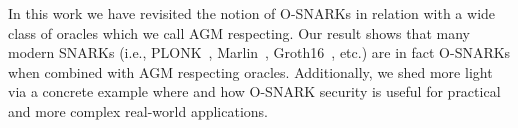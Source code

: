 In this work we have revisited the notion of O-SNARKs in relation with a wide class of oracles which we call AGM 
respecting. Our result shows that many modern SNARKs (i.e., PLONK~\cite{plonk}, Marlin~\cite{marlin}, Groth16~\cite{groth16}, etc.) 
are in fact O-SNARKs when combined with AGM respecting oracles. Additionally, we shed more light via a concrete 
example where and how O-SNARK security is useful for practical and more complex real-world applications. 

